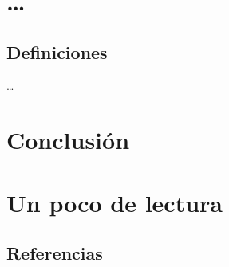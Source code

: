 
%

\begin{frame}[t,plain]
  \maketitle
\end{frame}

\begin{frame}
  \tableofcontents
\end{frame}

\section{\dots}

  \begin{frame}
    \tableofcontents[currentsection]
  \end{frame}

%
\subsection{Definiciones}

  \begin{frame}{\insertsection}
    \dots
  \end{frame}


\section*{Conclusión}

  \begin{frame}{\insertsection}
  \end{frame}

\appendix

\section{Un poco de lectura}

%
\subsection{Referencias}

